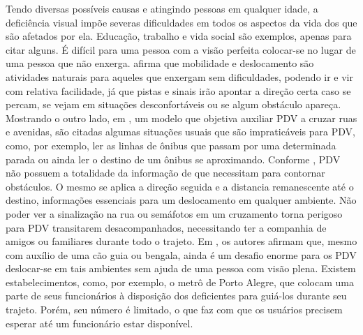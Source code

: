\documentclass[english,brazilian]{UNISINOSmonografia}
\begin{document}
Tendo diversas possíveis causas e atingindo pessoas em qualquer idade, a deficiência visual impõe severas dificuldades em todos os aspectos da vida dos que são afetados por ela. Educação, trabalho e vida social são exemplos, apenas para citar alguns. É difícil para uma pessoa com a visão perfeita colocar-se no lugar de uma pessoa que não enxerga.  afirma que mobilidade e deslocamento são atividades naturais para aqueles que enxergam sem dificuldades, podendo ir e vir com relativa facilidade, já que pistas e sinais irão apontar a direção certa caso se percam, se vejam em situações desconfortáveis ou se algum obstáculo apareça. Mostrando o outro lado, em , um modelo que objetiva auxiliar PDV a cruzar ruas e avenidas, são citadas algumas situações usuais que são impraticáveis para PDV, como, por exemplo, ler as linhas de ônibus que passam por uma determinada parada ou ainda ler o destino de um ônibus se aproximando. Conforme , PDV não possuem a totalidade da informação de que necessitam para contornar obstáculos. O mesmo se aplica a direção seguida e a distancia remanescente até o destino, informações essenciais para um deslocamento em qualquer ambiente. Não poder ver a sinalização na rua ou semáfotos em um cruzamento torna perigoso para PDV transitarem desacompanhados, necessitando ter a companhia de amigos ou familiares durante todo o trajeto. 
Em , os autores afirmam que, mesmo com auxílio de uma cão guia ou bengala, ainda é um desafio enorme para os PDV deslocar-se em tais ambientes sem ajuda de uma pessoa com visão plena. Existem estabelecimentos, como, por exemplo, o metrô de Porto Alegre, que colocam uma parte de seus funcionários à disposição dos deficientes para guiá-los durante seu trajeto. Porém, seu número é limitado, o que faz com que os usuários precisem esperar até um funcionário estar disponível.
\end{document}
